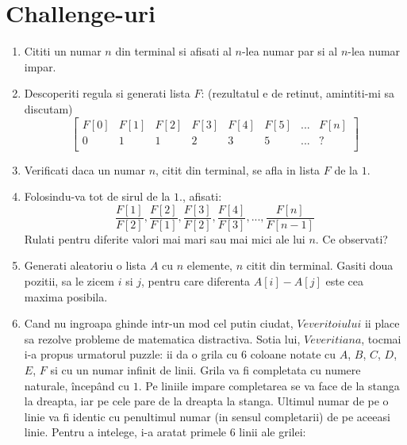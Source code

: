 \documentclass{article}
\begin{document}
\section{Challenge-uri}
    \begin{enumerate}
        \item Cititi un numar $n$ din terminal si afisati al $n$-lea numar par si al $n$-lea numar impar.
        \item Descoperiti regula si generati lista $F$: (rezultatul e de retinut, amintiti-mi sa discutam)
            \[\begin{bmatrix}
                F[0] & F[1] & F[2] & F[3] & F[4] & F[5] & ... & F[n] \\
                0 & 1 & 1 & 2 & 3 & 5 & ... & ?\\
              \end{bmatrix}\]
        \item Verificati daca un numar $n$, citit din terminal, se afla in lista $F$ de la $1.$
        \item Folosindu-va tot de sirul de la $1.$, afisati:
            \[\dfrac{F[1]}{F[2]}, \dfrac{F[2]}{F[1]}, \dfrac{F[3]}{F[2]}, \dfrac{F[4]}{F[3]}, ..., \dfrac{F[n]}{F[n-1]}\]
            Rulati pentru diferite valori mai mari sau mai mici ale lui $n$. Ce observati?
        \item Generati aleatoriu o lista $A$ cu $n$ elemente, $n$ citit din terminal. Gasiti doua pozitii, sa le zicem $i$ si $j$, pentru care diferenta $A[i] - A[j]$ este cea maxima posibila.
        \item Cand nu ingroapa ghinde intr-un mod cel putin ciudat, $Veveritoiului$ ii place sa rezolve probleme de matematica distractiva. Sotia lui, $Veveritiana$, tocmai i-a propus urmatorul puzzle: ii da o grila cu 6 coloane notate cu $A$, $B$, $C$, $D$, $E$, $F$ si cu un numar infinit de linii. Grila va fi completata cu numere naturale, începând cu $1$. Pe liniile impare completarea se va face de la stanga la dreapta, iar pe cele pare de la dreapta la stanga. Ultimul numar de pe o linie va fi identic cu penultimul numar (in sensul completarii) de pe aceeasi linie. Pentru a intelege, i-a aratat primele 6 linii ale grilei:



\end{enumerate}
\end{document}
